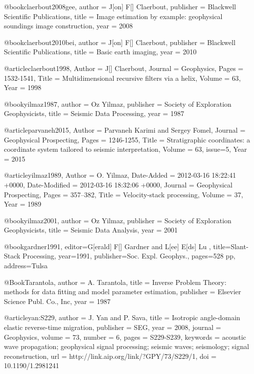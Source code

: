 @book{claerbout2008gee,
   author = {J[on] F[] Claerbout},
   publisher = {Blackwell Scientific Publications},
   title = {Image estimation by example: geophysical soundings image construction},
   year = {2008}
}

@book{claerbout2010bei,
   author = {J[on] F[] Claerbout},
   publisher = {Blackwell Scientific Publications},
   title = {Basic earth imaging},
   year = {2010}
}

@article{claerbout1998,
	Author = {J[] Claerbout},
	Journal = {Geophysics},
	Pages = {1532-1541},
	Title = {Multidimensional recursive filters via a helix},
	Volume = {63},
	Year = {1998}}

@book{yilmaz1987,
   author = {Oz Yilmaz},
   publisher = {Society of Exploration Geophysicists},
   title = {Seismic Data Processing},
   year = {1987}
}

@article{parvaneh2015,
	Author = {Parvaneh Karimi and Sergey Fomel},
	Journal = {Geophysical Prospecting},
	Pages = {1246-1255},
	Title = {Stratigraphic coordinates: a coordinate system tailored to seismic interpretation},
	Volume = {63},
	issue=5,
	Year = {2015}}
	

@article{yilmaz1989,
	Author = {O. Yilmaz},
	Date-Added = {2012-03-16 18:22:41 +0000},
	Date-Modified = {2012-03-16 18:32:06 +0000},
	Journal = {Geophysical Prospecting},
	Pages = {357--382},
	Title = {Velocity-stack processing},
	Volume = {37},
	Year = {1989}}

@book{yilmaz2001,
   author = {Oz Yilmaz},
   publisher = {Society of Exploration Geophysicists},
   title = {Seismic Data Analysis},
   year = {2001}
}

@book{gardner1991,
  editor={G[erald] F[]  Gardner  and L[ee] E[ds]  Lu },
  title={Slant-Stack Processing},
  year=1991,
  publisher={Soc. Expl. Geophys.},
  pages={528 pp},
  address={Tulsa}
}



@Book{Tarantola,
  author = 	 {A. Tarantola},
  title = 	 {Inverse {P}roblem {T}heory: methods for data
                 fitting and model parameter estimation},
  publisher = 	 {Elsevier Science Publ. Co., Inc},
  year = 	 1987
}

@article{yan:S229,
  author =	 {J. Yan and P. Sava},
  title =	 {Isotropic angle-domain elastic reverse-time
                  migration},
  publisher =	 {SEG},
  year =	 2008,
  journal =	 {Geophysics},
  volume =	 73,
  number =	 6,
  pages =	 {S229-S239},
  keywords =	 {acoustic wave propagation; geophysical signal
                  processing; seismic waves; seismology; signal
                  reconstruction},
  url =		 {http://link.aip.org/link/?GPY/73/S229/1},
  doi =		 {10.1190/1.2981241}
}

